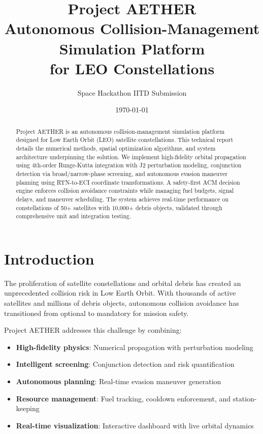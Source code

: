 \documentclass[11pt,a4paper]{article}
\title{\textbf{Project AETHER}\\[0.5cm]
        \Large Autonomous Collision-Management Simulation Platform\\
        for LEO Constellations}
\author{Space Hackathon IITD Submission}
\date{\today}
\begin{document}
\maketitle

\begin{abstract}
Project AETHER is an autonomous collision-management simulation platform designed for Low Earth Orbit (LEO) satellite constellations. This technical report details the numerical methods, spatial optimization algorithms, and system architecture underpinning the solution. We implement high-fidelity orbital propagation using 4th-order Runge-Kutta integration with J2 perturbation modeling, conjunction detection via broad/narrow-phase screening, and autonomous evasion maneuver planning using RTN-to-ECI coordinate transformations. A safety-first ACM decision engine enforces collision avoidance constraints while managing fuel budgets, signal delays, and maneuver scheduling. The system achieves real-time performance on constellations of 50+ satellites with 10,000+ debris objects, validated through comprehensive unit and integration testing.
\end{abstract}

\tableofcontents
\newpage

\section{Introduction}

The proliferation of satellite constellations and orbital debris has created an unprecedented collision risk in Low Earth Orbit. With thousands of active satellites and millions of debris objects, autonomous collision avoidance has transitioned from optional to mandatory for mission safety.

Project AETHER addresses this challenge by combining:
\begin{itemize}
    \item \textbf{High-fidelity physics}: Numerical propagation with perturbation modeling
    \item \textbf{Intelligent screening}: Conjunction detection and risk quantification
    \item \textbf{Autonomous planning}: Real-time evasion maneuver generation
    \item \textbf{Resource management}: Fuel tracking, cooldown enforcement, and station-keeping
    \item \textbf{Real-time visualization}: Interactive dashboard with live orbital dynamics
\end{itemize}
\end{document}
